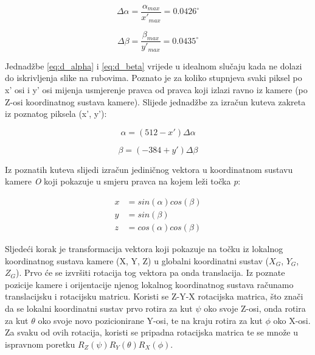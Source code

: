 \documentclass[times, utf8, diplomski]{fer}
\begin{document}
\begin{equation}
\Delta\alpha = \frac{\alpha_{max}}{x'_{max}} = 0.0426^{\circ}
\label{eq:d_alpha}
\end{equation}  

\begin{equation}
\Delta\beta = \frac{\beta_{max}}{y'_{max}} = 0.0435^{\circ}
\label{eq:d_beta}
\end{equation}

\vspace{5mm}

Jednadžbe \ref{eq:d_alpha} i \ref{eq:d_beta} vrijede u idealnom slučaju kada ne dolazi do iskrivljenja slike na rubovima. Poznato je za koliko stupnjeva svaki piksel po x' osi i y' osi mijenja usmjerenje pravca od pravca koji izlazi ravno iz kamere (po Z-osi koordinatnog sustava kamere). Slijede jednadžbe za izračun kuteva zakreta iz poznatog piksela (x', y'):

\begin{equation}
\alpha = (512 - x')\Delta\alpha
\label{eq:alpha}
\end{equation}

\begin{equation}
\beta = (-384 + y')\Delta\beta
\label{eq:beta}
\end{equation}

\vspace{5mm}

Iz poznatih kuteva slijedi izračun jediničnog vektora u koordinatnom sustavu kamere \textit{O} koji pokazuje u smjeru pravca na kojem leži točka \textit{p}:

\begin{align}
x &= sin(\alpha)cos(\beta) \\
y &= sin(\beta) \\
z &= cos(\alpha)cos(\beta)
\end{align}

\vspace{5mm}

Sljedeći korak je transformacija vektora koji pokazuje na točku iz lokalnog koordinatnog sustava kamere (X, Y, Z) u globalni koordinatni sustav ($X_G$, $Y_G$, $Z_G$). Prvo će se izvršiti rotacija tog vektora pa onda translacija. Iz poznate pozicije kamere i orijentacije njenog lokalnog koordinatnog sustava računamo translacijsku i rotacijsku matricu. Koristi se Z-Y-X rotacijska matrica, što znači da se lokalni koordinatni sustav prvo rotira za kut $\psi$ oko svoje Z-osi, onda rotira za kut $\theta$ oko svoje novo pozicionirane Y-osi, te na kraju rotira za kut $\phi$ oko X-osi. Za svaku od ovih rotacija, koristi se pripadna rotacijska matrica te se množe u ispravnom poretku $R_{Z}(\psi)R_{Y}(\theta)R_{X}(\phi)$.
\end{document}
